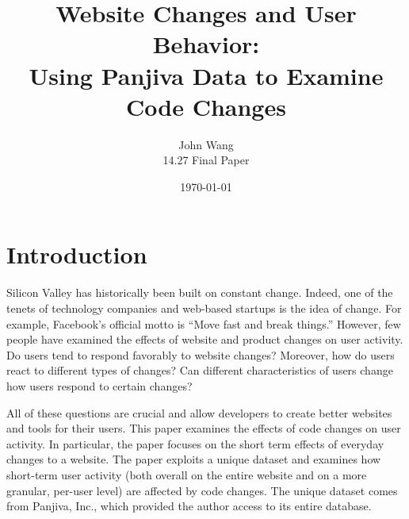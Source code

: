 \documentclass[10pt]{article}
\title{Website Changes and User Behavior: \\
Using Panjiva Data to Examine Code Changes}
\date{\today}
\author{John Wang \\
14.27 Final Paper}
\begin{document}
\maketitle


\tableofcontents

\newpage

\section{Introduction}

Silicon Valley has historically been built on constant change. Indeed, one of the tenets of technology companies and web-based startups is the idea of change. For example, Facebook's official motto is ``Move fast and break things.''  However, few people have examined the effects of website and product changes on user activity. Do users tend to respond favorably to website changes? Moreover, how do users react to different types of changes? Can different characteristics of users change how users respond to certain changes?

All of these questions are crucial and allow developers to create better websites and tools for their users. This paper examines the effects of code changes on user activity. In particular, the paper focuses on the short term effects of everyday changes to a website. The paper exploits a unique dataset and examines how short-term user activity (both overall on the entire website and on a more granular, per-user level) are affected by code changes. The unique dataset comes from Panjiva, Inc., which provided the author access to its entire database.
\end{document}
